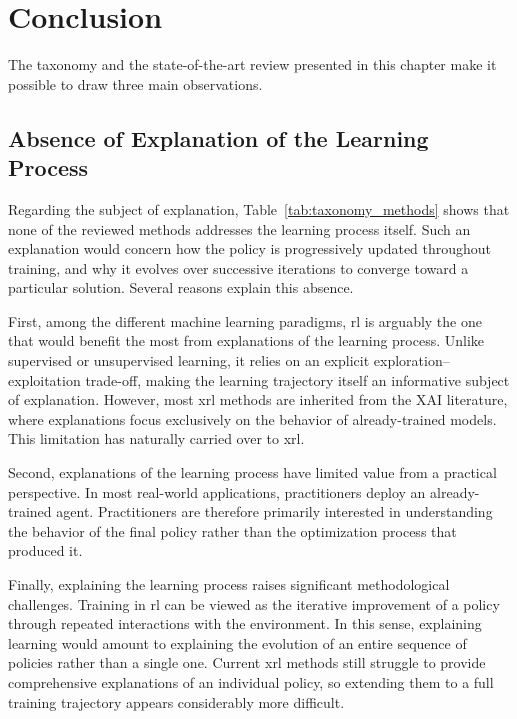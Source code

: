 \section{Conclusion}
\label{sec:explainability_in_reinforcement_learning_conclusion}

The taxonomy and the state-of-the-art review presented in this chapter make it possible to draw three main observations.

\subsection{Absence of Explanation of the Learning Process}

Regarding the subject of explanation, Table~\ref{tab:taxonomy_methods} shows that none of the reviewed methods addresses the learning process itself.
Such an explanation would concern how the policy is progressively updated throughout training, and why it evolves over successive iterations to converge toward a particular solution.
Several reasons explain this absence.

First, among the different machine learning paradigms, \gls{rl} is arguably the one that would benefit the most from explanations of the learning process.
Unlike supervised or unsupervised learning, it relies on an explicit exploration--exploitation trade-off, making the learning trajectory itself an informative subject of explanation.
However, most \gls{xrl} methods are inherited from the XAI literature, where explanations focus exclusively on the behavior of already-trained models.
This limitation has naturally carried over to \gls{xrl}.

Second, explanations of the learning process have limited value from a practical perspective.
In most real-world applications, practitioners deploy an already-trained agent.
Practitioners are therefore primarily interested in understanding the behavior of the final policy rather than the optimization process that produced it.

Finally, explaining the learning process raises significant methodological challenges.
Training in \gls{rl} can be viewed as the iterative improvement of a policy through repeated interactions with the environment.
In this sense, explaining learning would amount to explaining the evolution of an entire sequence of policies rather than a single one.
Current \gls{xrl} methods still struggle to provide comprehensive explanations of an individual policy, so extending them to a full training trajectory appears considerably more difficult.

